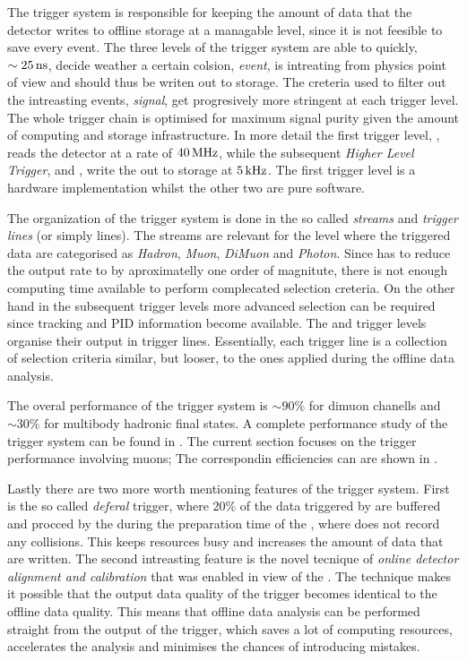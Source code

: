 The trigger system is responsible for keeping the amount of data that the detector writes to offline storage
at a managable level, since it is not feesible to save every event. The three levels of the \lhcb trigger system
are able to quickly, $\sim 25{\rm \,ns}$, decide weather a certain colsion, {\it event}, is intreating from physics point
of view and should thus be writen out to storage. The creteria used to filter out the intreasting events, {\it signal}, get
progresively more stringent at each trigger level. The whole trigger chain is optimised for maximum
signal purity given the amount of computing and storage infrastructure. In more detail the first trigger
level, \lzero, reads the detector at a rate of $40{\rm \,MHz}$, while the subsequent {\it Higher Level Trigger},
\hltone and \hlttwo, write the out to storage at $5{\rm \,kHz}$. The first trigger level is a hardware implementation
whilst the other two are pure software.

The organization of the trigger system is done in the so called {\it streams} and {\it trigger lines} (or simply lines).
The streams are relevant for the \lzero level where the triggered data are categorised as {\it Hadron}, {\it Muon},
{\it DiMuon} and {\it Photon}. Since \lzero has to reduce the output rate to \hltone by aproximatelly one order of
magnitute, there is not enough computing time available to perform complecated selection creteria. On the other
hand in the subsequent trigger levels more advanced selection can be required since tracking and PID information
become available. The \hltone and \hlttwo trigger levels organise their output in trigger lines. Essentially,
each trigger line is a collection of selection criteria similar, but looser, to the ones applied during the
offline data analysis.

The overal performance of the \lhcb trigger system is $\sim 90\%$ for dimuon chanells and $\sim 30\%$ for
multibody hadronic final states. A complete performance study of the trigger system can be found in \cite{}.
The current section focuses on the trigger performance involving muons; The correspondin efficiencies can
are shown in \figref{}.

Lastly there are two more worth mentioning features of the \lhcb trigger system. First is the so called
{\it deferal} trigger, where $20\%$ of the data triggered by \lzero are buffered and procced by the \hltone
during the preparation time of the \lhc, where \lhcb does not record any collisions. This keeps resources busy and increases the amount of data that are written.
The second intreasting feature is the novel tecnique of {\it online detector alignment and calibration} that was
enabled in view of the \runtwo. The technique makes it possible that the output data quality of the trigger
becomes identical to the offline data quality. This means that offline data analysis can be performed straight
from the output of the trigger, which saves a lot of computing resources, accelerates the analysis and minimises
the chances of introducing mistakes.


